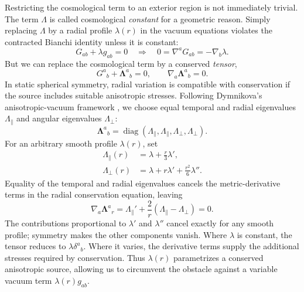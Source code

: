 \documentclass[
 aps,
 prd,
 reprint,
 superscriptaddress,
 nofootinbib,
 longbibliography
]{revtex4-2}
\begin{document}
Restricting the cosmological term to an exterior region is not immediately trivial. The term $\Lambda$ is called cosmological \emph{constant} for a geometric reason. Simply replacing $\Lambda$ by a radial profile $\lambda(r)$ in the vacuum
equations violates the contracted Bianchi identity unless it is constant:
\begin{equation}
 G_{ab}+\lambda g_{ab}=0
 \quad\Longrightarrow\quad
 0=\nabla^aG_{ab}=-\nabla_b\lambda.
 \label{eq:variable_lambda_bianchi}
\end{equation}
But we can replace the cosmological term by a conserved \emph{tensor},
\begin{equation}
 G^a{}_b+\boldsymbol{\Lambda}^a{}_b=0,
 \qquad \nabla_a\boldsymbol{\Lambda}^a{}_b=0.
 \label{eq:cosmological_tensor_equations}
\end{equation}
In static spherical symmetry, radial variation is compatible with
conservation if the source includes suitable anisotropic stresses.
Following Dymnikova's anisotropic-vacuum framework
\cite{Dymnikova:2000algebraic,Dymnikova:2002mass}, we choose equal temporal
and radial eigenvalues $\Lambda_{\parallel}$ and angular eigenvalues
$\Lambda_{\perp}$:
\begin{equation}
 \boldsymbol{\Lambda}^a{}_b
 =\operatorname{diag}\!\left(
 \Lambda_{\parallel},\Lambda_{\parallel},
 \Lambda_{\perp},\Lambda_{\perp}\right).
 \label{eq:exterior_cosmological_tensor}
\end{equation}
For an arbitrary smooth profile $\lambda(r)$, set
\begin{align}
 \Lambda_{\parallel}(r)&=\lambda+\frac{r}{3}\lambda',
 \label{eq:lambda_parallel}\\
 \Lambda_{\perp}(r)&=\lambda+r\lambda'
 +\frac{r^2}{6}\lambda''.
 \label{eq:lambda_perp}
\end{align}
Equality of the temporal and radial eigenvalues cancels the metric-derivative
terms in the radial conservation equation, leaving
\begin{equation}
 \nabla_a\boldsymbol{\Lambda}^a{}_r
 =\Lambda_{\parallel}'
 +\frac{2}{r}\left(\Lambda_{\parallel}-\Lambda_{\perp}\right)=0.
 \label{eq:exterior_conservation_check}
\end{equation}
The contributions proportional to $\lambda'$ and $\lambda''$ cancel exactly
for any smooth profile; symmetry makes the other components vanish.
Where $\lambda$ is constant, the tensor reduces to
$\lambda\delta^a{}_b$.  Where it varies, the derivative terms supply the
additional stresses required by conservation.  Thus $\lambda(r)$
parametrizes a conserved anisotropic source, allowing us to circumvent the obstacle against  a variable vacuum term $\lambda(r)g_{ab}$.
\end{document}
